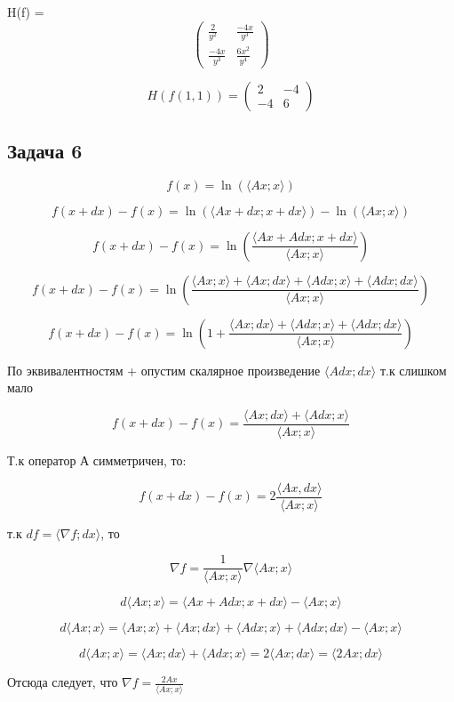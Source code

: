 \documentclass[a4paper,12pt]{article}
\begin{document}
H(f) = 
\[
\begin{pmatrix}
    \frac{2}{y^2} & \frac{-4x}{y^3} \\
    \frac{-4x}{y^3} & \frac{6x^2}{y^4}
\end{pmatrix}
\]

\[
    H(f(1, 1)) = \begin{pmatrix}
    2 & -4 \\
    -4 & 6
    \end{pmatrix}
\]

\subsection{Задача 6}
\[
f(x) = \ln(\langle Ax; x\rangle)
\]

\[
f(x+dx) - f(x) = \ln(\langle Ax+dx; x+dx\rangle) - \ln(\langle Ax; x \rangle)
\]

\[
f(x+dx) - f(x) = \ln(\frac{\langle Ax+Adx; x+dx\rangle}{\langle Ax; x \rangle})
\]

\[
f(x+dx) - f(x) =  \ln(\frac{\langle Ax; x \rangle + \langle Ax; dx \rangle + \langle Adx; x \rangle + \langle Adx; dx \rangle }{\langle Ax; x \rangle})
\]

\[
f(x+dx) - f(x) =  \ln(1 + \frac{ \langle Ax; dx \rangle + \langle Adx; x \rangle + \langle Adx; dx \rangle}{\langle Ax; x \rangle})
\]

По эквивалентностям + опустим скалярное произведение $\langle Adx; dx \rangle$ т.к слишком мало

\[
f(x+dx) - f(x) =  \frac{ \langle Ax; dx \rangle + \langle Adx; x \rangle}{\langle Ax; x \rangle}
\]

Т.к оператор А симметричен, то:

\[
f(x+dx) - f(x) = 2 \frac{\langle Ax, dx \rangle}{\langle Ax; x \rangle}
\]

т.к $df = \langle \nabla f; dx \rangle$, то

\[
\nabla f = \frac{1}{\langle Ax; x \rangle} \nabla \langle Ax; x \rangle
\]

\[
d\langle Ax; x \rangle = \langle Ax + Adx; x + dx \rangle - \langle Ax; x \rangle
\]


\[
d\langle Ax; x \rangle = \langle Ax; x \rangle + \langle Ax; dx \rangle + \langle Adx; x \rangle + \langle Adx; dx \rangle - \langle Ax; x \rangle
\]

\[
d\langle Ax; x \rangle = \langle Ax; dx \rangle + \langle Adx; x \rangle = 2 \langle Ax; dx \rangle = \langle 2Ax; dx \rangle
\]

Отсюда следует, что $\nabla f = \frac{2Ax}{\langle Ax; x \rangle}$
\end{document}
